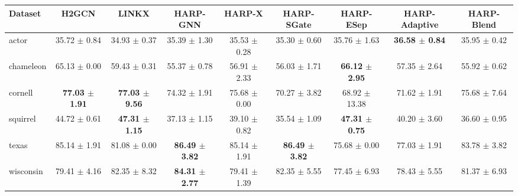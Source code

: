 \begin{tabular}{lcccccccc}
\toprule
Dataset & H2GCN & LINKX & HARP-GNN & HARP-X & HARP-SGate & HARP-ESep & HARP-Adaptive & HARP-Blend \\
\midrule
actor & 35.72 $\pm$ 0.84 & 34.93 $\pm$ 0.37 & 35.39 $\pm$ 1.30 & 35.53 $\pm$ 0.28 & 35.30 $\pm$ 0.60 & 35.76 $\pm$ 1.63 & \textbf{36.58 $\pm$ 0.84} & 35.95 $\pm$ 0.42 \\
chameleon & 65.13 $\pm$ 0.00 & 59.43 $\pm$ 0.31 & 55.37 $\pm$ 0.78 & 56.91 $\pm$ 2.33 & 56.03 $\pm$ 1.71 & \textbf{66.12 $\pm$ 2.95} & 57.35 $\pm$ 2.64 & 55.92 $\pm$ 0.62 \\
cornell & \textbf{77.03 $\pm$ 1.91} & \textbf{77.03 $\pm$ 9.56} & 74.32 $\pm$ 1.91 & 75.68 $\pm$ 0.00 & 70.27 $\pm$ 3.82 & 68.92 $\pm$ 13.38 & 71.62 $\pm$ 1.91 & 75.68 $\pm$ 7.64 \\
squirrel & 44.72 $\pm$ 0.61 & \textbf{47.31 $\pm$ 1.15} & 37.13 $\pm$ 1.15 & 39.10 $\pm$ 0.82 & 35.54 $\pm$ 1.09 & \textbf{47.31 $\pm$ 0.75} & 40.20 $\pm$ 3.60 & 36.60 $\pm$ 0.95 \\
texas & 85.14 $\pm$ 1.91 & 81.08 $\pm$ 0.00 & \textbf{86.49 $\pm$ 3.82} & 85.14 $\pm$ 1.91 & \textbf{86.49 $\pm$ 3.82} & 75.68 $\pm$ 0.00 & 77.03 $\pm$ 1.91 & 83.78 $\pm$ 3.82 \\
wisconsin & 79.41 $\pm$ 4.16 & 82.35 $\pm$ 8.32 & \textbf{84.31 $\pm$ 2.77} & 79.41 $\pm$ 1.39 & 82.35 $\pm$ 5.55 & 77.45 $\pm$ 6.93 & 78.43 $\pm$ 5.55 & 81.37 $\pm$ 6.93 \\
\bottomrule
\end{tabular}
